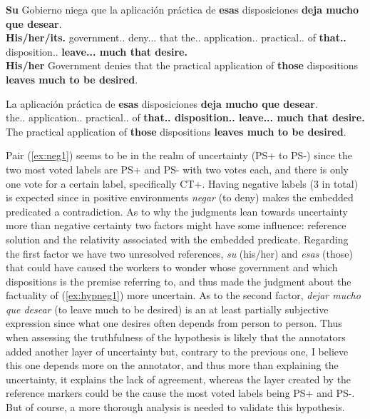 \begin{exe}
  \ex\label{ex:neg1}
    \begin{xlist}
      \item{\gll \textbf{Su} Gobierno niega que la aplicación práctica de \textbf{esas} disposiciones \textbf{deja mucho que desear}.\\ \textbf{His/her/its.\Sg{}} government.\M.\Sg{} deny.\Prs.\Ind.\Tsg{} that the.\F.\Sg{} application.\F.\Sg{} practical.\F.\Sg{} of \textbf{that.\F.\Pl{}} disposition.\F.\Pl{} \textbf{leave.\Prs.\Ind.\Tsg{} much that desire.\Inf{}} \\\glt \textbf{His/her} Government denies that the practical application of \textbf{those} dispositions \textbf{leaves much to be desired}.}
      \item{\gll La aplicación práctica de \textbf{esas} disposiciones \textbf{deja mucho que desear}.\\ the.\F.\Sg{} application.\F.\Sg{} practical.\F.\Sg{} of \textbf{that.\F.\Pl{} disposition.\F.\Pl{} leave.\Prs.\Ind.\Tsg{} much that desire.\Inf{}}\\\glt The practical application of \textbf{those} dispositions \textbf{leaves much to be desired}.} \label{ex:hypneg1}
    \end{xlist}
\end{exe}

Pair (\ref{ex:neg1}) seems to be in the realm of uncertainty (PS+ to PS-) since the two most voted labels are PS+ and PS- with two votes each, and there is only one vote for a certain label, specifically CT+. Having negative labels ($3$ in total) is expected since in positive environments \textit{negar} (to deny) makes the embedded predicated a contradiction. As to why the judgments lean towards uncertainty more than negative certainty two factors might have some influence: reference solution and the relativity associated with the embedded predicate. Regarding the first factor we have two unresolved references, \textit{su} (his/her) and \textit{esas} (those) that could have caused the workers to wonder whose government and which dispositions is the premise referring to, and thus made the judgment about the factuality of (\ref{ex:hypneg1}) more uncertain. As to the second factor, \textit{dejar mucho que desear} (to leave much to be desired) is an at least partially subjective expression since what one desires often depends from person to person. Thus when assessing the truthfulness of the hypothesis is likely that the annotators added another layer of uncertainty but, contrary to the previous one, I believe this one depends more on the annotator, and thus more than explaining the uncertainty, it explains the lack of agreement, whereas the layer created by the reference markers could be the cause the most voted labels being PS+ and PS-. But of course, a more thorough analysis is needed to validate this hypothesis.\\

